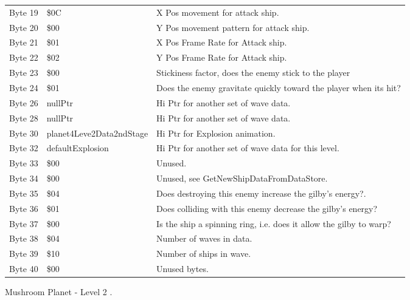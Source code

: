 \begin{figure}[H]
{\begin{adjustbox}{width=12cm}
\begin{tabular}{lll}
 Byte 19 & \$0C                      & X Pos movement for attack ship.                                    \\
 Byte 20 & \$00                      & Y Pos movement pattern for attack ship.                            \\
 Byte 21 & \$01                      & X Pos Frame Rate for Attack ship.                                  \\
 Byte 22 & \$02                      & Y Pos Frame Rate for Attack ship.                                  \\
 Byte 23 & \$00                      & Stickiness factor, does the enemy stick to the player              \\
 Byte 24 & \$01                      & Does the enemy gravitate quickly toward the player when its hit?   \\
 Byte 26 & nullPtr                  & Hi Ptr for another set of wave data.                               \\
 Byte 28 & nullPtr                  & Hi Ptr for another set of wave data.                               \\
 Byte 30 & planet4Leve2Data2ndStage & Hi Ptr for Explosion animation.                                    \\
 Byte 32 & defaultExplosion         & Hi Ptr for another set of wave data for this level.                \\
 Byte 33 & \$00                      & Unused.                                                            \\
 Byte 34 & \$00                      & Unused, see GetNewShipDataFromDataStore.                           \\
 Byte 35 & \$04                      & Does destroying this enemy increase the gilby's energy?.           \\
 Byte 36 & \$01                      & Does colliding with this enemy decrease the gilby's energy?        \\
 Byte 37 & \$00                      & Is the ship a spinning ring, i.e. does it allow the gilby to warp? \\
 Byte 38 & \$04                      & Number of waves in data.                                           \\
 Byte 39 & \$10                      & Number of ships in wave.                                           \\
 Byte 40 & \$00                      & Unused bytes.                                                      \\
\bottomrule
\end{tabular}

  \end{adjustbox}

  }\caption*{Mushroom Planet - Level 2
.}
\end{figure}

